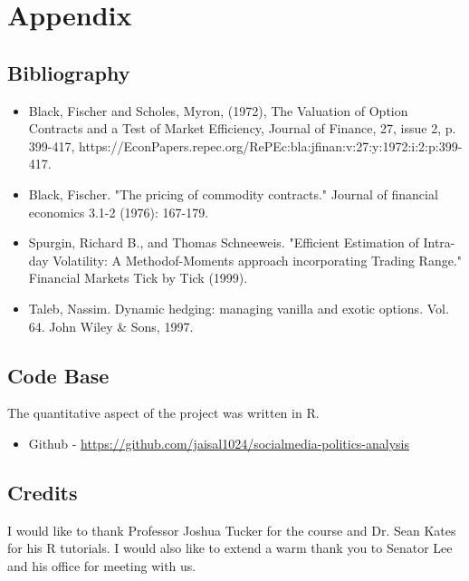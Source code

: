 \documentclass{article}
\begin{document}
\section{Appendix}
\subsection{Bibliography}
\begin{itemize}
\item Black, Fischer and Scholes, Myron, (1972), The Valuation of Option Contracts and a Test of Market Efficiency, Journal of Finance, 27, issue 2, p. 399-417, https://EconPapers.repec.org/RePEc:bla:jfinan:v:27:y:1972:i:2:p:399-417.
\item Black, Fischer. "The pricing of commodity contracts." Journal of financial economics 3.1-2 (1976): 167-179.
\item Spurgin, Richard B., and Thomas Schneeweis. "Efficient Estimation of Intra-day Volatility: A Methodof-Moments approach incorporating Trading Range." Financial Markets Tick by Tick (1999).
\item Taleb, Nassim. Dynamic hedging: managing vanilla and exotic options. Vol. 64. John Wiley \& Sons, 1997.
\end{itemize}

\subsection{Code Base}
\begin{flushleft}
 The quantitative aspect of the project was written in R. 
\begin{itemize}
\item Github -  \url{https://github.com/jaisal1024/socialmedia-politics-analysis}
\end{itemize}
\end{flushleft}

\subsection{Credits}
\begin{flushleft}
I would like to thank Professor Joshua Tucker for the course and Dr. Sean Kates for his R tutorials. I would also like to extend a warm thank you to Senator Lee and his office for meeting with us. 
\end{flushleft}
\end{document}
